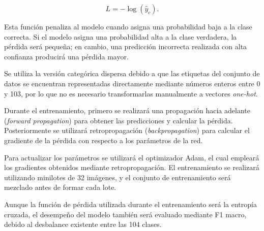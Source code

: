 \begin{equation}
    L = -\log(\hat{y}_c).
\end{equation}

Esta función penaliza al modelo cuando asigna una probabilidad baja a la clase correcta. Si el modelo asigna una probabilidad alta a la clase verdadera, la pérdida será pequeña; en cambio, una predicción incorrecta realizada con alta confianza producirá una pérdida mayor.

Se utiliza la versión categórica dispersa debido a que las etiquetas del conjunto de datos se encuentran representadas directamente mediante números enteros entre 0 y 103, por lo que no es necesario transformarlas manualmente a vectores \textit{one-hot}.

Durante el entrenamiento, primero se realizará una propagación hacia adelante (\textit{forward propagation}) para obtener las predicciones y calcular la pérdida. Posteriormente se utilizará retropropagación (\textit{backpropagation}) para calcular el gradiente de la pérdida con respecto a los parámetros de la red.

Para actualizar los parámetros se utilizará el optimizador Adam, el cual empleará los gradientes obtenidos mediante retropropagación. El entrenamiento se realizará utilizando minilotes de 32 imágenes, y el conjunto de entrenamiento será mezclado antes de formar cada lote.

Aunque la función de pérdida utilizada durante el entrenamiento será la entropía cruzada, el desempeño del modelo también será evaluado mediante F1 macro, debido al desbalance existente entre las 104 clases.
